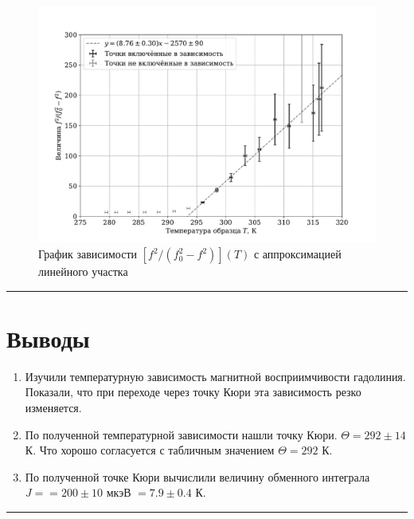 \documentclass[a4paper,12pt]{article} %
\begin{document}
\begin{figure}[h]
\centering
\includegraphics[width=\textwidth]{plot.pdf}
\caption{График зависимости $[f^2 / (f_0^2 - f^2)](T)$ с аппроксимацией линейного участка}
\label{fig:plot}
\end{figure}


\medskip\hrule\medskip

\section{Выводы}

\begin{enumerate}
\item Изучили температурную зависимость магнитной восприимчивости гадолиния. Показали, что при переходе через точку Кюри эта зависимость резко изменяется.
\item По полученной температурной зависимости нашли точку Кюри. $\Theta = 292 \pm 14$ К. Что хорошо согласуется с табличным значением $\Theta = 292$ К.
\item По полученной точке Кюри вычислили величину обменного интеграла $J = = 200 \pm 10$ мкэВ $ = 7.9 \pm 0.4$ К.
\end{enumerate}



\medskip\hrule\medskip
\end{document}
